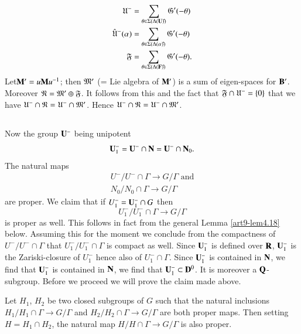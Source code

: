 \begin{align*}
\mathfrak{U}^- & = \sum\limits_{\theta \in \Sigma (\Delta (\mathbf{U}) \hat{})} \mathfrak{G}' (-\theta)\\
\hat{\mathfrak{U}}^- (\alpha) &= \sum\limits_{\theta \in \Sigma (\Delta (\alpha) \hat{})} \mathfrak{G}'(-\theta)\\
\mathfrak{F} & = \sum\limits_{\theta \in \Sigma (\Delta (\mathbf{F}) \hat{})} \mathfrak{G}'(-\theta).
\end{align*}
Let\pageoriginale $\mathbf{M}' = u \mathbf{M} u^{-1}$; then $\mathfrak{M}'$ (= Lie algebra of $\mathbf{M}'$) is a sum of eigen-spaces for $\mathbf{B}'$. Moreover $\mathfrak{N} = \mathfrak{M}' \oplus \mathfrak{F}$. It follows from this and the fact that $\mathfrak{F} \cap \mathfrak{U}^-=\{0\}$ that we have $\mathfrak{U}^- \cap \mathfrak{N} = \mathfrak{U}^- \cap \mathfrak{M}'$. Hence $\mathfrak{U}^- \cap \mathfrak{N} = \mathfrak{U}^- \cap \mathfrak{M}'$.

\subsection{}\label{art9-subsec4.17}
Now the group $\mathbf{U}^-$ being unipotent 
$$
\mathbf{U}^-_1 = \mathbf{U}^- \cap \mathbf{N} = \mathbf{U}^- \cap \mathbf{N}_0.
$$
The natural maps 
\begin{gather*}
U^- / U^- \cap \Gamma \to G/\Gamma \text{ and}\\
N_0 / N_0 \cap \Gamma \to G / \Gamma
\end{gather*}
are proper. We claim that if $U^-_1 = \mathbf{U}^-_1 \cap G$ then
$$
U^-_1 / U^-_1 \cap \Gamma \to G / \Gamma
$$
is proper as well. This follows in fact from the general Lemma \ref{art9-lem4.18} below. Assuming this for the moment we conclude from the compactness of $U^-/U^- \cap \Gamma$ that $U^-_1/ U^-_1 \cap \Gamma$ is compact as well. Since $\mathbf{U}^-_1$ is defined over $\mathbf{R}$, $\mathbf{U}^-_1$ is the Zariski-closure of $U^-_1$ hence also of $U^-_1 \cap \Gamma$. Since $\mathbf{U}^-_1$ is contained in $\mathbf{N}$, we find that $\mathbf{U}^-_1$ is contained in $\mathbf{N}$, we find that $\mathbf{U}^-_1 \subset \mathbf{D}^0$. It is moreover a $\mathbf{Q}$-subgroup. Before we proceed we will prove the claim made above.

\setcounter{definition}{17}
\begin{lemma}\label{art9-lem4.18}
Let $H_1$, $H_2$ be two closed subgroups of $G$ such that the natural inclusions $H_1/ H_1 \cap \Gamma \to G / \Gamma$ and $H_2/ H_2 \cap \Gamma \to G/\Gamma$ are both proper maps. Then setting $H = H_1 \cap H_2$, the natural map $H/ H \cap \Gamma \to G / \Gamma$ is also proper.
\end{lemma}


